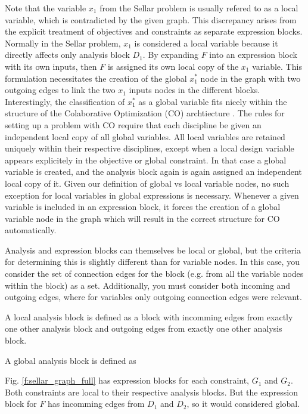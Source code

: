   Note that the variable $x_1$ from the Sellar problem is usually refered to as 
  a local variable, which is contradicted by the given graph. This discrepancy 
  arises from the explicit treatment of objectives and constraints as separate 
  expression blocks. Normally in the Sellar problem, $x_1$ is considered a local 
  variable because it directly affects only analysis block $D_1$. By expanding
  $F$ into an expression block with its own inputs, then $F$ is assigned its own local 
  copy of the $x_1$ variable. This formulation necessitates the creation of the global $x_1^*$ 
  node in the graph with two outgoing edges to link the two $x_1$ inputs nodes 
  in the different blocks. Interestingly, the classification of $x_1^*$ 
  as a global variable fits nicely within the structure of the Colaborative 
  Optimization (CO) archtiecture \cite{braun1996thesis}. The rules for setting up 
  a problem with CO require that each discipline be given an independent local 
  copy of all global variables. All local variables are retained uniquely 
  within their respective disciplines, except when a local design variable appears 
  explicitely in the objective or global constraint. In that case a global 
  variable is created, and the analysis block again is again assigned an 
  independent local copy of it. Given our definition of global vs local variable 
  nodes, no such exception for local variables in global expressions is 
  necessary. Whenever a given variable is included in an expression block, 
  it forces the creation of a global variable node in the graph which will 
  result in the correct structure for CO automatically. 

  Analysis and expression blocks can themselves be local or global, but the 
  criteria for determining this is slightly different than for variable nodes. 
  In this case, you consider the set of connection edges for the block
  (e.g. from all the variable nodes within the block) as a set. Additionally, 
  you must consider both incoming and outgoing edges, where for variables 
  only outgoing connection edges were relevant. 

  A local analysis block is defined as a block with incomming edges from 
  exactly one other analysis block and outgoing edges from exactly one other analysis 
  block. 

  A global analysis block is defined as 

  Fig. 
  \ref{f:sellar_graph_full} has expression blocks for each constraint, 
  $G_1$ and $G_2$. Both constraints are local to their respective analysis 
  blocks. But the expression block for $F$ has incomming edges from $D_1$ and 
  $D_2$, so it would considered global. 

